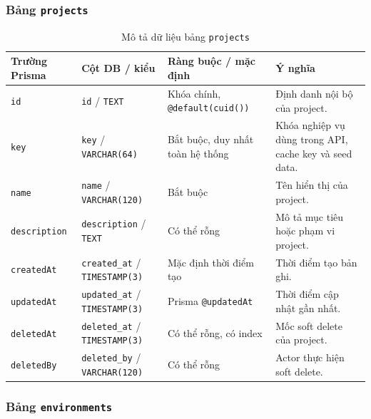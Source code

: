 \subsubsection{Bảng \texttt{projects}}

\begin{table}[H]
    \centering
    \caption{Mô tả dữ liệu bảng \texttt{projects}}
    \label{tab:db-projects}
    \begingroup
    \singlespacing
    \scriptsize
    \setlength{\tabcolsep}{3pt}
    \renewcommand{\arraystretch}{1.12}
    \begin{tabular}{p{} p{} p{} p{}}
        \toprule
        \textbf{Trường Prisma} & \textbf{Cột DB / kiểu} & \textbf{Ràng buộc / mặc định} & \textbf{Ý nghĩa} \\
        \midrule
        \texttt{id} & \texttt{id} / \texttt{TEXT} & Khóa chính, \texttt{@default(cuid())} & Định danh nội bộ của project. \\
        \texttt{key} & \texttt{key} / \texttt{VARCHAR(64)} & Bắt buộc, duy nhất toàn hệ thống & Khóa nghiệp vụ dùng trong API, cache key và seed data. \\
        \texttt{name} & \texttt{name} / \texttt{VARCHAR(120)} & Bắt buộc & Tên hiển thị của project. \\
        \texttt{description} & \texttt{description} / \texttt{TEXT} & Có thể rỗng & Mô tả mục tiêu hoặc phạm vi project. \\
        \texttt{createdAt} & \texttt{created\_at} / \texttt{TIMESTAMP(3)} & Mặc định thời điểm tạo & Thời điểm tạo bản ghi. \\
        \texttt{updatedAt} & \texttt{updated\_at} / \texttt{TIMESTAMP(3)} & Prisma \texttt{@updatedAt} & Thời điểm cập nhật gần nhất. \\
        \texttt{deletedAt} & \texttt{deleted\_at} / \texttt{TIMESTAMP(3)} & Có thể rỗng, có index & Mốc soft delete của project. \\
        \texttt{deletedBy} & \texttt{deleted\_by} / \texttt{VARCHAR(120)} & Có thể rỗng & Actor thực hiện soft delete. \\
        \bottomrule
    \end{tabular}
    \endgroup
\end{table}

\subsubsection{Bảng \texttt{environments}}


